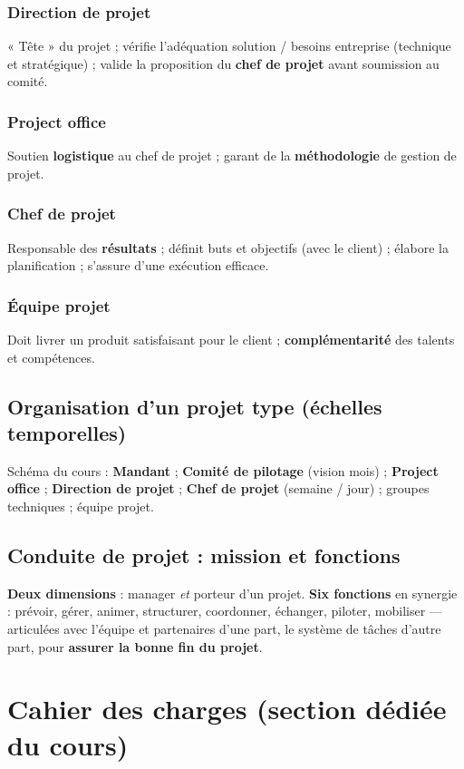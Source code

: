 \documentclass[11pt,a4paper]{article}
\begin{document}
\subsubsection{Direction de projet}
« Tête » du projet ; vérifie l'adéquation solution / besoins entreprise (technique et stratégique) ; valide la proposition du \textbf{chef de projet} avant soumission au comité.

\subsubsection{Project office}
Soutien \textbf{logistique} au chef de projet ; garant de la \textbf{méthodologie} de gestion de projet.

\subsubsection{Chef de projet}
Responsable des \textbf{résultats} ; définit buts et objectifs (avec le client) ; élabore la planification ; s'assure d'une exécution efficace.

\subsubsection{Équipe projet}
Doit livrer un produit satisfaisant pour le client ; \textbf{complémentarité} des talents et compétences.

\subsection{Organisation d'un projet type (échelles temporelles)}
Schéma du cours : \textbf{Mandant} ; \textbf{Comité de pilotage} (vision mois) ; \textbf{Project office} ; \textbf{Direction de projet} ; \textbf{Chef de projet} (semaine / jour) ; groupes techniques ; équipe projet.

\subsection{Conduite de projet : mission et fonctions}
\textbf{Deux dimensions} : manager \emph{et} porteur d'un projet. \textbf{Six fonctions} en synergie : prévoir, gérer, animer, structurer, coordonner, échanger, piloter, mobiliser — articulées avec l'équipe et partenaires d'une part, le système de tâches d'autre part, pour \textbf{assurer la bonne fin du projet}.

\section{Cahier des charges (section dédiée du cours)}
\end{document}
